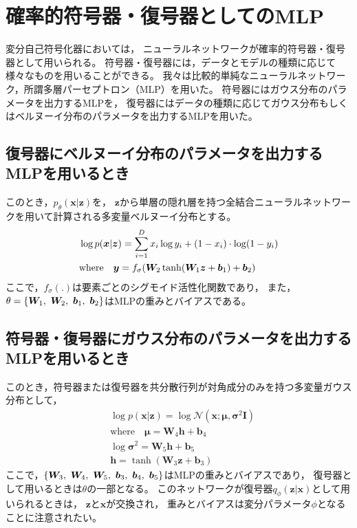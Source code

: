 \documentclass[dvipdfmx, fleqn]{jsarticle}
\begin{document}
\section{確率的符号器・復号器としてのMLP}

変分自己符号化器においては，
ニューラルネットワークが確率的符号器・復号器として用いられる。
符号器・復号器には，データとモデルの種類に応じて様々なものを用いることができる。
我々は比較的単純なニューラルネットワーク，所謂多層パーセプトロン（MLP）を用いた。
符号器にはガウス分布のパラメータを出力するMLPを，
復号器にはデータの種類に応じてガウス分布もしくはベルヌーイ分布のパラメータを出力するMLPを用いた。

\subsection{復号器にベルヌーイ分布のパラメータを出力するMLPを用いるとき}

このとき，\(p_{\theta} (\bm{x} | \bm{z})\)を，
\(\bm{z}\)から単層の隠れ層を持つ全結合ニューラルネットワークを用いて計算される多変量ベルヌーイ分布とする。
\begin{equation}
    \begin{split}
        & \log{p(\bm{x} | \bm{z})} = \sum_{i=1}^{D} x_i \log{y_i} + (1 - x_i) \cdot \log(1 - y_i) \\
        & \text{where} \quad
            \bm{y} = f_{\sigma} \qty(\bm{W}_2 \tanh(\bm{W}_1 \bm{z} + \bm{b}_1) + \bm{b}_2)
    \end{split}
\end{equation}
ここで，\(f_{\sigma} (.)\)は要素ごとのシグモイド活性化関数であり，
また，\(\theta = \qty{\bm{W}_1,\ \bm{W}_2,\ \bm{b}_1,\ \bm{b}_2}\)はMLPの重みとバイアスである。


\subsection{符号器・復号器にガウス分布のパラメータを出力するMLPを用いるとき}

このとき，符号器または復号器を共分散行列が対角成分のみを持つ多変量ガウス分布として，
\begin{equation}
    \begin{split}
        & \log{p(\bm{x} | \bm{z})} = \log{\mathcal{N}(\bm{x}; \bm{\mu}, \bm{\sigma}^2 \bm{I})} \\
        & \text{where} \quad \bm{\mu} = \bm{W}_4 \bm{h} + \bm{b}_4 \\
        & \log{\bm{\sigma}^2} = \bm{W}_5  \bm{h} + \bm{b}_5 \\
        & \bm{h} = \tanh(\bm{W}_3 \bm{z} + \bm{b}_3)
    \end{split}
\end{equation}
ここで，\(\qty{\bm{W}_3,\ \bm{W}_4,\ \bm{W}_5,\ \bm{b}_3,\ \bm{b}_4,\ \bm{b}_5}\)はMLPの重みとバイアスであり，
復号器として用いるときは\(\theta\)の一部となる。
このネットワークが復号器\(q_{\phi} (\bm{z} | \bm{x})\)として用いられるときは，
\(\bm{z}\)と\(\bm{x}\)が交換され，
重みとバイアスは変分パラメータ\(\phi\)となることに注意されたい。
\end{document}
